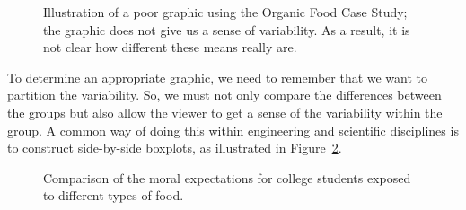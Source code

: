 \documentclass[
  letterpaper,
  DIV=11,
  numbers=noendperiod]{scrreprt}
\theoremstyle{plain}
\theoremstyle{definition}
\theoremstyle{definition}
\theoremstyle{remark}
\begin{document}
\begin{figure}


\caption{\label{fig-anovasummaries-bad-bar}Illustration of a poor
graphic using the Organic Food Case Study; the graphic does not give us
a sense of variability. As a result, it is not clear how different these
means really are.}

\end{figure}%

To determine an appropriate graphic, we need to remember that we want to
partition the variability. So, we must not only compare the differences
between the groups but also allow the viewer to get a sense of the
variability within the group. A common way of doing this within
engineering and scientific disciplines is to construct side-by-side
boxplots, as illustrated in
Figure~\ref{fig-anovasummaries-organic-boxplot}.

\begin{figure}


\caption{\label{fig-anovasummaries-organic-boxplot}Comparison of the
moral expectations for college students exposed to different types of
food.}

\end{figure}%
\end{document}

